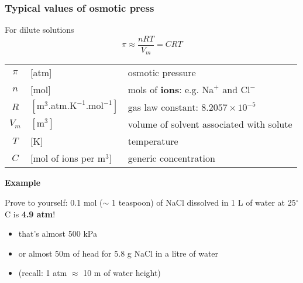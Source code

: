 \begin{frame}\frametitle{Typical values of osmotic press}
	\begin{exampleblock}{For dilute solutions}  %
		\[
			\pi \approx \dfrac{nRT}{V_m} = CRT
		\]
	\end{exampleblock}
	\begin{tabular}{cll}
		$\pi$		&	[atm] 													& osmotic pressure \\
		$n$ 		&  	[mol]													& mols of \textbf{ions}: e.g. $\text{Na}^{+}$ and $\text{Cl}^{-}$\\
		$R$			&	$[\text{m}^3\text{.atm.K}^{-1}\text{.mol}^{-1}]$ 		& gas law constant: $8.2057 \times 10^{-5}$\\
		$V_m$ 		&  	$[\text{m}^{3}]$										& volume of solvent associated with solute\\
		$T$ 		&  	[K]														& temperature\\
		$C$ 		&  	[mol of ions per m$^{3}$]								& generic concentration
	\end{tabular}

	\vspace{12pt}
	\textbf{Example}

	\vspace{6pt}
	Prove to yourself: 0.1 mol ($\sim$ 1 teaspoon) of NaCl dissolved in 1 L of water at 25$^\circ$C is \textbf{4.9 atm}!
	\begin{itemize}
		\item	that's almost 500 kPa
		\item	or almost 50m of head for 5.8 g NaCl in a litre of water
		\item	(recall: 1 atm $\approx$ 10 m of water height)
	\end{itemize}
\end{frame}

